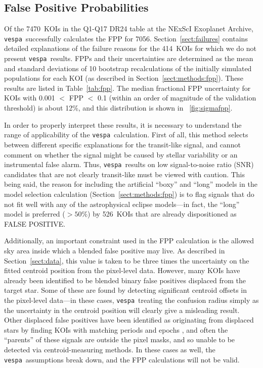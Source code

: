 \documentclass{emulateapj}
\newcommand{\figref}[1]{\ref{fig:#1}}
\newcommand{\Fig}[1]{\figurename~\figref{#1}}
\newcommand{\fig}[1]{\Fig{#1}}
\newcommand{\Tab}[1]{Table~\ref{tab:#1}}
\newcommand{\tab}[1]{\Tab{#1}}
\newcommand{\sectionname}{Section}
\newcommand{\Sect}[1]{\sectionname~\ref{sect:#1}}
\newcommand{\sect}[1]{\Sect{#1}}
\newcommand{\sectlabel}[1]{\label{sect:#1}}
\newcommand{\ntotal}{7470}
\newcommand{\nfail}{414}
\newcommand{\ncalc}{7056}
\newcommand{\nlongfp}{526}
\newcommand{\vespa}{\texttt{vespa}}
\begin{document}

\subsection{False Positive Probabilities}
\sectlabel{results:fpp}

Of the \ntotal\ KOIs in the Q1-Q17 DR24 table at the NExScI Exoplanet
Archive, \vespa\ successfully calculates the FPP for \ncalc.  
\Sect{failures} contains detailed explanations of the failure reasons for 
the \nfail\ KOIs for which we do not present \vespa\ results.  
FPPs and their uncertainties are determined as the mean and standard 
deviations of 10 bootstrap 
recalculations of the initially simulated populations for each KOI (as described in 
\sect{methods:fpp}).  These results are listed in \tab{fpp}.  
The median fractional FPP uncertainty 
for KOIs with 0.001 $<$ FPP $<$ 0.1 (within an order of magnitude of the 
validation threshold) is about 12\%, and this distribution 
is shown in \fig{sigmafpp}.


In order to properly interpret these results, it is necessary to
understand the range of applicability of the \vespa\ calculation.
First of all, this method selects between different specific explanations 
for the transit-like signal, and cannot
comment on whether the signal might be caused by stellar variability
or an instrumental false alarm.  Thus, \vespa\ results on low
signal-to-noise ratio (SNR) candidates that are not clearly
transit-like must be viewed with caution.  This being said, the reason 
for including the artificial 
``boxy'' and ``long'' models in the model selection calculation
 (\sect{methods:fpp}) is to flag signals that do not 
fit well with any of the astrophysical eclipse models---in fact, the ``long''
model is preferred ($>50\%$) by \nlongfp\ KOIs that are already dispositioned
as FALSE POSITIVE.  


Additionally, an important constraint used in the FPP calculation is the
allowed sky area inside which a blended false positive may live.  As
described in \sect{data}, this value is taken to be three times the
uncertainty on the fitted centroid position from the pixel-level data.
However, many KOIs have already been identified to be blended binary
false positives displaced from the target star.  Some of these are
found by detecting significant centroid offsets in the pixel-level
data---in these cases, \vespa\ treating the confusion radius simply as
the uncertainty in the centroid position will clearly give a
misleading result.  Other displaced false positives have been
identified as originating from displaced stars by finding KOIs with
matching periods and epochs \citep{Coughlin:2014}, and often the
``parents'' of these signals are outside the pixel masks, and so
unable to be detected via centroid-measuring methods.  In these cases
as well, the \vespa\ assumptions break down, and the FPP calculations
will not be valid.
\end{document}
